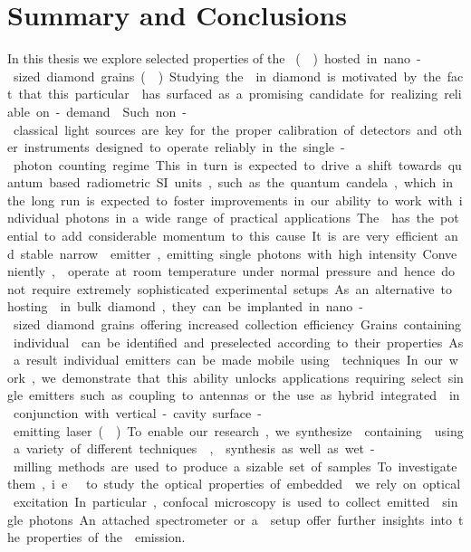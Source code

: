 

 \chapter*{Summary and Conclusions}	\label{ch::conclusion}

   In this thesis we explore selected properties of the \si \cc (\siv) hosted in nano-sized diamond grains (\nds). Studying the \sivc in diamond is motivated by the fact that this particular \cc has surfaced as a promising candidate for realizing reliable on-demand \spss. Such non-classical light sources are key for the proper calibration of detectors and other instruments designed to operate reliably in the single-photon counting regime. This in turn is expected to drive a shift towards quantum based radiometric SI units, such as the quantum candela, which in the long run is expected to foster improvements in our ability to work with individual photons in a wide range of practical applications.

   The \siv has the potential to add considerable momentum to this cause. It is are very efficient and stable narrow \lw emitter, emitting single photons with high intensity. Conveniently, \sivs operate at room temperature under normal pressure and hence do not require extremely sophisticated experimental setups. As an alternative to hosting \sivs in bulk diamond, they can be implanted in nano-sized diamond grains offering increased collection efficiency. Grains containing individual \sivs can be identified and preselected according to their properties. As a result individual emitters can be made mobile using \pp techniques. In our work, we demonstrate that this ability unlocks applications requiring select single emitters such as coupling to antennas or the use as hybrid integrated \spss in conjunction with vertical-cavity surface-emitting laser (\VCSEL).

   To enable our research, we synthesize \nds containing \sivs using a variety of different techniques. \Cvd, \hpht synthesis as well as wet-milling methods are used to produce a sizable set of samples. To investigate them, i.e\ to study the optical properties of embedded \sivs we rely on optical excitation. In particular, confocal microscopy is used to collect emitted \fl single photons. An attached spectrometer or a \HBT setup offer further insights into the properties of the \fl emission.

